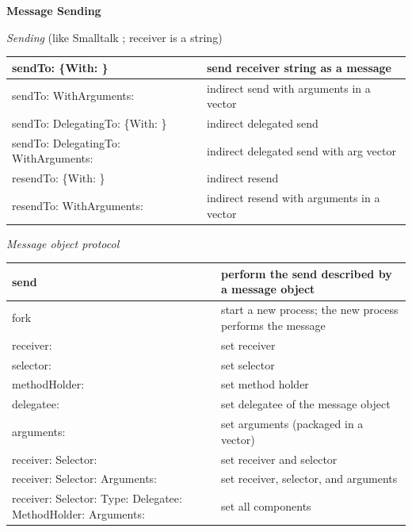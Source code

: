 \documentclass[letterpaper,10pt,english]{sphinxmanual}
\begin{document}
\textbf{Message Sending}

\emph{Sending} (like Smalltalk ; receiver is a string)

\begin{tabulary}{\linewidth}{p{5cm} p{10cm}}
\hline

sendTo: \{With: \}
 & 
send receiver string as a message
\\\hline

sendTo: WithArguments:
 & 
indirect send with arguments in a vector
\\\hline

sendTo: DelegatingTo: \{With: \}
 & 
indirect delegated send
\\\hline

sendTo: DelegatingTo: WithArguments:
 & 
indirect delegated send with arg vector
\\\hline

resendTo: \{With: \}
 & 
indirect resend
\\\hline

resendTo: WithArguments:
 & 
indirect resend with arguments in a vector
\\\hline
\end{tabulary}


\emph{Message object protocol}

\begin{tabulary}{\linewidth}{p{5cm} p{10cm}}
\hline

send
 & 
perform the send described by a message object
\\\hline

fork
 & 
start a new process; the new process performs the message
\\\hline

receiver:
 & 
set receiver
\\\hline

selector:
 & 
set selector
\\\hline

methodHolder:
 & 
set method holder
\\\hline

delegatee:
 & 
set delegatee of the message object
\\\hline

arguments:
 & 
set arguments (packaged in a vector)
\\\hline

receiver: Selector:
 & 
set receiver and selector
\\\hline

receiver: Selector: Arguments:
 & 
set receiver, selector, and arguments
\\\hline

receiver: Selector: Type: Delegatee: MethodHolder: Arguments:
 & 
set all components
\\\hline
\end{tabulary}
\end{document}
